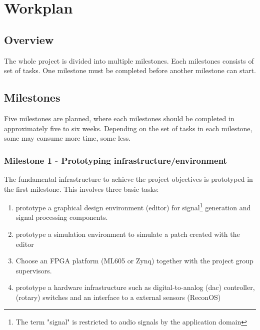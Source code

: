 
\chapter{Workplan}
\label{chapter:Workplan}

\section{Overview}


The whole project is divided into multiple milestones. Each milestones consists of set of tasks. One milestone must be completed before another milestone can start.

\section{Milestones}

Five milestones are planned, where each milestones should be completed in approximately five to six weeks. Depending on the set of tasks in each milestone, some may consume more time, some less.

\subsection{Milestone 1 - Prototyping infrastructure/environment}

The fundamental infrastructure to achieve the project objectives is prototyped in the first milestone. This involves three basic tasks:

\begin{enumerate}
	\item prototype a graphical design environment (editor) for signal\footnote{The term "signal" is restricted to audio signals by the application domain} generation and signal processing components. 
	\item prototype a simulation environment to simulate a patch created with the editor
	\item Choose an \ac{FPGA} platform (ML605 or Zynq) together with the project group supervisors.
	\item prototype a hardware infrastructure such as digital-to-analog (dac) controller, (rotary) switches and an interface to a external sensors (ReconOS)
\end{enumerate}

